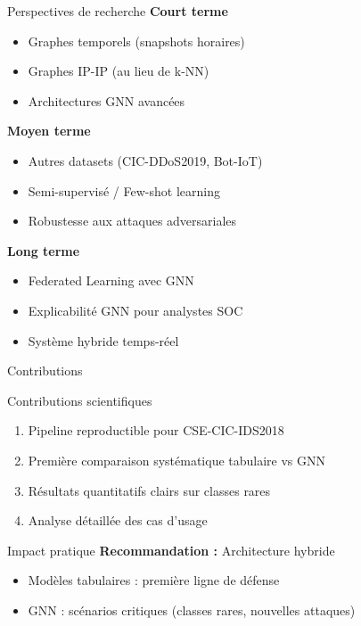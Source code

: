﻿\documentclass[aspectratio=169]{beamer}
\begin{document}
\begin{frame}{Perspectives de recherche}
\textbf{Court terme}
\begin{itemize}
    \item Graphes temporels (snapshots horaires)
    \item Graphes IP-IP (au lieu de k-NN)
    \item Architectures GNN avancées
\end{itemize}

\vspace{0.3cm}

\textbf{Moyen terme}
\begin{itemize}
    \item Autres datasets (CIC-DDoS2019, Bot-IoT)
    \item Semi-supervisé / Few-shot learning
    \item Robustesse aux attaques adversariales
\end{itemize}

\vspace{0.3cm}

\textbf{Long terme}
\begin{itemize}
    \item Federated Learning avec GNN
    \item Explicabilité GNN pour analystes SOC
    \item Système hybride temps-réel
\end{itemize}
\end{frame}

\begin{frame}{Contributions}
\begin{block}{Contributions scientifiques}
\begin{enumerate}
    \item Pipeline reproductible pour CSE-CIC-IDS2018
    \item Première comparaison systématique tabulaire vs GNN
    \item Résultats quantitatifs clairs sur classes rares
    \item Analyse détaillée des cas d'usage
\end{enumerate}
\end{block}

\vspace{0.3cm}

\begin{exampleblock}{Impact pratique}
\textbf{Recommandation :} Architecture hybride
\begin{itemize}
    \item Modèles tabulaires : première ligne de défense
    \item GNN : scénarios critiques (classes rares, nouvelles attaques)
\end{itemize}
\end{exampleblock}
\end{frame}
\end{document}
